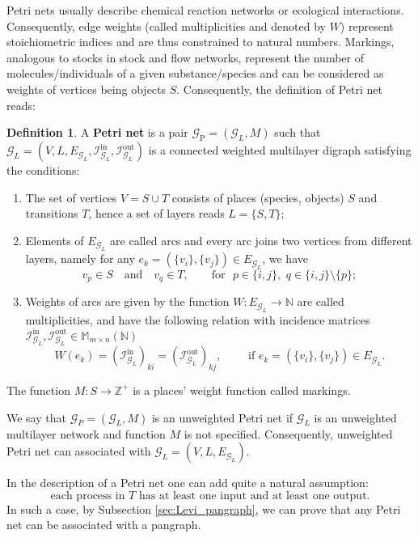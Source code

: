 \documentclass[a4paper,12pt]{article}
\theoremstyle{definition}
\newtheorem{definition}{Definition}
\theoremstyle{remark}
\newcommand{\mG}{\mathcal{G}}
\newcommand{\tin}{\mathrm{in}}
\newcommand{\out}{\mathrm{out}}
\newcommand{\inci}{\mathcal{I}^{\tin}}
\newcommand{\inco}{\mathcal{I}^{\out}}
\begin{document}
Petri nets usually describe chemical reaction networks or ecological interactions. Consequently, edge weights (called multiplicities and denoted by $W$) represent stoichiometric indices and are thus constrained to natural numbers. Markings, analogous to stocks in stock and flow networks, represent the number of molecules/individuals of a given substance/species and can be considered as weights of vertices being objects $S$. Consequently, the definition of Petri net reads:
\begin{definition}\label{def:petr}
    A \textbf{Petri net} is a pair $\mathcal{G}_{\textrm{P}}=(\mathcal{G}_L,M)$ such that $\mathcal{G}_L=(V,L,E_{\mathcal{G}_L}, \inci_{\mG_L},\inco_{\mG_L})$ is a connected weighted multilayer digraph satisfying the conditions:
    \begin{enumerate}
  \item  The set of vertices $V=S\cup T$ consists of places (species, objects) $S$ and transitions $T$, hence a set of layers reads $L=\{S,T\}$;
    \item  Elements of $E_{\mG_L}$ are called arcs and every arc joins two vertices from different layers, namely for any $e_{k}=(\{v_i\},\{v_j\})\in E_{\mG_L}$, we have
    \begin{equation}\label{eq:bipart_ST}
    v_p\in S \quad \textrm{and}\quad v_q\in T,\qquad \textrm{for }\,\, p\in \{i,j\},\,\, q\in \{i,j\}\setminus\{p\};
    \end{equation}
    \item  Weights of arcs are given by the function $W:E_{\mG_L}\to \mathbb{N}$ are called multiplicities, and have the following relation with incidence matrices  $\inci_{\mG_L},\inco_{\mG_L}\in \mathbb{M}_{m\times n}(\mathbb{N})$
    \begin{equation*}
W(e_k)=\left(\inci_{\mG_L}\right)_{ki}=\left(\inco_{\mG_L}\right)_{kj},\qquad \textrm{ if }e_k=(\{v_i\},\{v_j\})\in E_{\mG_L}.
    \end{equation*}
    \end{enumerate}
     The function $M: S \rightarrow \mathbb{Z}^{+}$ is a places' weight function called markings.
\end{definition}

We say that $\mG_{P}=(\mG_L,M)$ is an \textrm{unweighted Petri net} if $\mG_L$ is an unweighted multilayer network and function $M$ is not specified. Consequently, unweighted Petri net can associated with $\mG_L=(V,L,E_{\mG_L})$.

In the description of a Petri net one can add quite a natural assumption: 
\begin{equation}\label{eq:in_out_PN}
\textrm{each process in } T \textrm{ has at least one input and at least one output.} 
\end{equation}
In such a case, by Subsection \ref{sec:Levi_pangraph}, we can prove that any Petri net can be associated with a pangraph.
\end{document}
